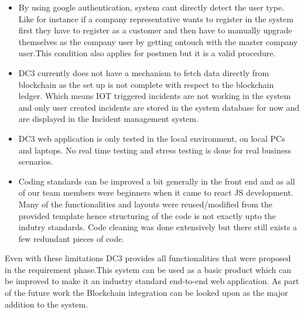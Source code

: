\begin{itemize}
\item By using google authentication, system cant directly detect the user type. Like for instance if a company representative wants to register in the system first they have to register as a customer and then have to manually upgrade themselves as the company user by getting ontouch with the master company user.This condition also applies for postmen but it is a valid procedure.
\end{itemize}
\begin{itemize}
\item DC3 currently does not have a mechanism to fetch data directly from blockchain as the set up is not complete with respect to the blockchain ledger. Which means IOT triggered incidents are not working in the system and only user created incidents are stored in the system database for now and are displayed in the Incident management system.
\item DC3 web application is only tested in the local environment, on local PCs and laptops. No real time testing and stress testing is done for real business scenarios.
\end{itemize}
\begin{itemize}
\item Coding standards can be improved a bit generally in the front end and as all of our team members were beginners when it came to react JS development. Many of the functionalities and layouts were reused/modified from the provided template hence structuring of the code is not exactly upto the indutry standards. Code cleaning was done extensively but there still exists a few redundant pieces of code. 
\end{itemize}
Even with these limitations DC3 provides all functionalities that were proposed in the requirement phase.This system can be used as a  basic product which can be improved to make it an industry standard end-to-end web application. As part of the future work the Blockchain integration can be looked upon as the major addition to the system.
